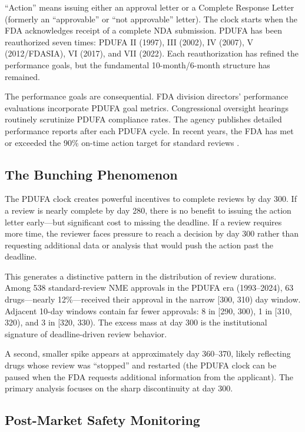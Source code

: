\documentclass[12pt]{article}
\begin{document}
``Action'' means issuing either an approval letter or a Complete Response Letter (formerly an ``approvable'' or ``not approvable'' letter). The clock starts when the FDA acknowledges receipt of a complete NDA submission. PDUFA has been reauthorized seven times: PDUFA II (1997), III (2002), IV (2007), V (2012/FDASIA), VI (2017), and VII (2022). Each reauthorization has refined the performance goals, but the fundamental 10-month/6-month structure has remained.

The performance goals are consequential. FDA division directors' performance evaluations incorporate PDUFA goal metrics. Congressional oversight hearings routinely scrutinize PDUFA compliance rates. The agency publishes detailed performance reports after each PDUFA cycle. In recent years, the FDA has met or exceeded the 90\% on-time action target for standard reviews \citep{gao2008pdufa, darrow2020fda}.

\subsection{The Bunching Phenomenon}

The PDUFA clock creates powerful incentives to complete reviews by day 300. If a review is nearly complete by day 280, there is no benefit to issuing the action letter early---but significant cost to missing the deadline. If a review requires more time, the reviewer faces pressure to reach a decision by day 300 rather than requesting additional data or analysis that would push the action past the deadline.

This generates a distinctive pattern in the distribution of review durations. Among 538 standard-review NME approvals in the PDUFA era (1993--2024), 63 drugs---nearly 12\%---received their approval in the narrow [300, 310) day window. Adjacent 10-day windows contain far fewer approvals: 8 in [290, 300), 1 in [310, 320), and 3 in [320, 330). The excess mass at day 300 is the institutional signature of deadline-driven review behavior.

A second, smaller spike appears at approximately day 360--370, likely reflecting drugs whose review was ``stopped'' and restarted (the PDUFA clock can be paused when the FDA requests additional information from the applicant). The primary analysis focuses on the sharp discontinuity at day 300.

\subsection{Post-Market Safety Monitoring}
\end{document}
